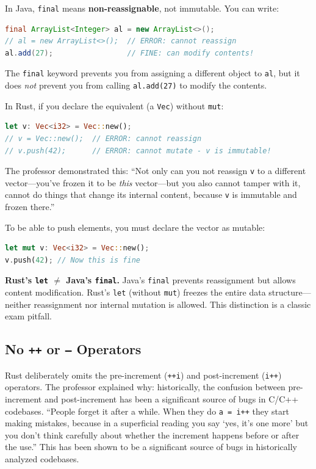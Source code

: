 In Java, \texttt{final} means \textbf{non-reassignable}, not immutable. You can write:

\begin{lstlisting}[language=Java]
final ArrayList<Integer> al = new ArrayList<>();
// al = new ArrayList<>();  // ERROR: cannot reassign
al.add(27);                 // FINE: can modify contents!
\end{lstlisting}

The \texttt{final} keyword prevents you from assigning a different object to \texttt{al}, but it does \emph{not} prevent you from calling \texttt{al.add(27)} to modify the contents.

In Rust, if you declare the equivalent (a \texttt{Vec}) without \texttt{mut}:

\begin{lstlisting}[language=Rust]
let v: Vec<i32> = Vec::new();
// v = Vec::new();  // ERROR: cannot reassign
// v.push(42);      // ERROR: cannot mutate - v is immutable!
\end{lstlisting}

The professor demonstrated this: ``Not only can you not reassign \texttt{v} to a different vector---you've frozen it to be \emph{this} vector---but you also cannot tamper with it, cannot do things that change its internal content, because \texttt{v} is immutable and frozen there.''

To be able to push elements, you must declare the vector as mutable:

\begin{lstlisting}[language=Rust]
let mut v: Vec<i32> = Vec::new();
v.push(42); // Now this is fine
\end{lstlisting}

\begin{warningbox}
\textbf{Rust's \texttt{let} $\neq$ Java's \texttt{final}.} Java's \texttt{final} prevents reassignment but allows content modification. Rust's \texttt{let} (without \texttt{mut}) freezes the entire data structure---neither reassignment nor internal mutation is allowed. This distinction is a classic exam pitfall.
\end{warningbox}

\subsection{No \texttt{++} or \texttt{--} Operators}

Rust deliberately omits the pre-increment (\texttt{++i}) and post-increment (\texttt{i++}) operators. The professor explained why: historically, the confusion between pre-increment and post-increment has been a significant source of bugs in C/C++ codebases. ``People forget it after a while. When they do \texttt{a = i++} they start making mistakes, because in a superficial reading you say `yes, it's one more' but you don't think carefully about whether the increment happens before or after the use.'' This has been shown to be a significant source of bugs in historically analyzed codebases.

